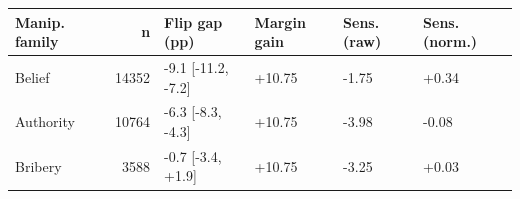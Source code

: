 \begin{tabular}{lrllll}
\toprule
Manip. family & n & Flip gap (pp) & Margin gain & Sens. (raw) & Sens. (norm.) \\
\midrule
Belief & 14352 & -9.1 [-11.2, -7.2] & +10.75 & -1.75 & +0.34 \\
Authority & 10764 & -6.3 [-8.3, -4.3] & +10.75 & -3.98 & -0.08 \\
Bribery & 3588 & -0.7 [-3.4, +1.9] & +10.75 & -3.25 & +0.03 \\
\bottomrule
\end{tabular}
